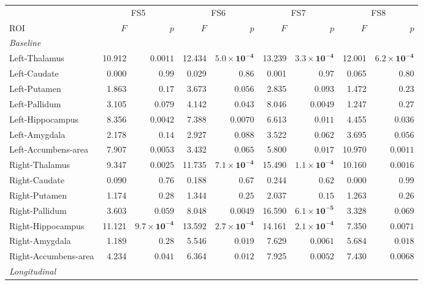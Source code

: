 \begin{tabular}{lrrrrrrrr}
\toprule
 & \multicolumn{2}{c}{FS5} & \multicolumn{2}{c}{FS6} & \multicolumn{2}{c}{FS7} & \multicolumn{2}{c}{FS8} \\
\cmidrule(lr){2-3}\cmidrule(lr){4-5}\cmidrule(lr){6-7}\cmidrule(lr){8-9}
ROI & $F$ & $p$ & $F$ & $p$ & $F$ & $p$ & $F$ & $p$ \\
\midrule
\multicolumn{9}{l}{\textit{Baseline}} \\
Left-Thalamus & 10.912 & $\mathbf{0.0011}$ & 12.434 & $\mathbf{5.0{\times}10^{-4}}$ & 13.239 & $\mathbf{3.3{\times}10^{-4}}$ & 12.001 & $\mathbf{6.2{\times}10^{-4}}$ \\
Left-Caudate & 0.000 & $0.99$ & 0.029 & $0.86$ & 0.001 & $0.97$ & 0.065 & $0.80$ \\
Left-Putamen & 1.863 & $0.17$ & 3.673 & $0.056$ & 2.835 & $0.093$ & 1.472 & $0.23$ \\
Left-Pallidum & 3.105 & $0.079$ & 4.142 & $0.043$ & 8.046 & $0.0049$ & 1.247 & $0.27$ \\
Left-Hippocampus & 8.356 & $0.0042$ & 7.388 & $0.0070$ & 6.613 & $0.011$ & 4.455 & $0.036$ \\
Left-Amygdala & 2.178 & $0.14$ & 2.927 & $0.088$ & 3.522 & $0.062$ & 3.695 & $0.056$ \\
Left-Accumbens-area & 7.907 & $0.0053$ & 3.432 & $0.065$ & 5.800 & $0.017$ & 10.970 & $\mathbf{0.0011}$ \\
Right-Thalamus & 9.347 & $\mathbf{0.0025}$ & 11.735 & $\mathbf{7.1{\times}10^{-4}}$ & 15.490 & $\mathbf{1.1{\times}10^{-4}}$ & 10.160 & $\mathbf{0.0016}$ \\
Right-Caudate & 0.090 & $0.76$ & 0.188 & $0.67$ & 0.244 & $0.62$ & 0.000 & $0.99$ \\
Right-Putamen & 1.174 & $0.28$ & 1.344 & $0.25$ & 2.037 & $0.15$ & 1.263 & $0.26$ \\
Right-Pallidum & 3.603 & $0.059$ & 8.048 & $0.0049$ & 16.590 & $\mathbf{6.1{\times}10^{-5}}$ & 3.328 & $0.069$ \\
Right-Hippocampus & 11.121 & $\mathbf{9.7{\times}10^{-4}}$ & 13.592 & $\mathbf{2.7{\times}10^{-4}}$ & 14.161 & $\mathbf{2.1{\times}10^{-4}}$ & 7.350 & $0.0071$ \\
Right-Amygdala & 1.189 & $0.28$ & 5.546 & $0.019$ & 7.629 & $0.0061$ & 5.684 & $0.018$ \\
Right-Accumbens-area & 4.234 & $0.041$ & 6.364 & $0.012$ & 7.925 & $0.0052$ & 7.430 & $0.0068$ \\
\midrule
\multicolumn{9}{l}{\textit{Longitudinal}} \\

\end{tabular}
